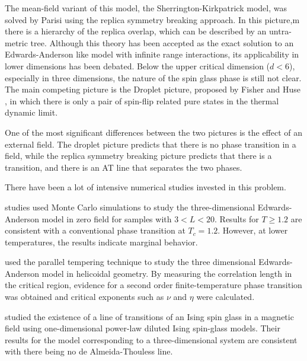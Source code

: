The mean-field variant of this model, the Sherrington-Kirkpatrick model\cite{Sherrington-Kirkpatrick1978,Sherrington-Kirkpatrick-1975}, was 
solved by Parisi\cite{Parisi-1980a,Parisi-1980b,Parisi1980} using the replica 
symmetry breaking approach. In this picture,m
there is a hierarchy of the replica overlap, which can be described by an untra-metric
tree. Although this theory has been accepted as the exact solution to an Edwards-Anderson
like model with infinite range interactions, its applicability in lower dimensions 
has been debated. Below the upper critical dimension ($d<6$)\cite{Harris-Lubensky-Chen-1976,Tasaki-1989,Green-Moore-Bray-1983}, especially in three 
dimensions, the nature of the spin glass phase is still not clear. The main 
competing picture is the Droplet picture, proposed by Fisher and Huse \cite{Fisher-Huse-1988,Fisher-Huse-1987}, in which 
there is only a pair of spin-flip related pure states in the thermal dynamic
limit.

One of the most significant differences between the two pictures is the effect 
of an external field\cite{Young-Katzgraber2004}. The droplet picture predicts that there is no phase transition
in a field, while the replica symmetry breaking picture predicts that there is a 
transition, and there is an AT line that separates the two phases. 

There have been a lot of intensive numerical studies invested in this problem.

\citet{Bhatt-Young-1985} studies used Monte Carlo simulations to study the three-dimensional
Edwards-Anderson model in zero field for samples with $3<L<20$. Results for 
$T\ge1.2$ are consistent with a conventional phase transition at $T_c=1.2$.
However, at lower temperatures, the results indicate marginal behavior.

\citet{PhysRevB.62.14237} used the parallel tempering technique to study the three dimensional
Edwards-Anderson model in helicoidal geometry. By measuring the correlation length
in the critical region,  evidence for a second order finite-temperature phase 
transition was obtained and critical exponents such as $\nu$ and $\eta$ were 
calculated.

\citet{Young-Katzgraber2004} studied the existence of a line of transitions of an Ising spin glass 
in a magnetic field using one-dimensional power-law diluted Ising spin-glass models. 
Their results for the model corresponding to a three-dimensional system are 
consistent with there being no de Almeida-Thouless line.

